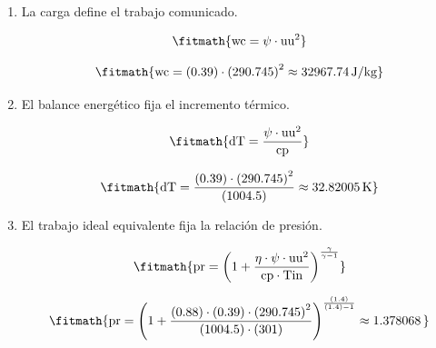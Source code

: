 \begin{enumerate}

\item La carga define el trabajo comunicado.

\[\fitmath{\mathrm{wc}=\psi\cdot {\mathrm{uu}}^{2}}\]

\[\fitmath{\mathrm{wc}=(0.39)\cdot {(290.745)}^{2}\approx 32967.74\,\mathrm{J/kg}}\]

\item El balance energético fija el incremento térmico.

\[\fitmath{\mathrm{dT}=\frac{\psi\cdot {\mathrm{uu}}^{2}}{\mathrm{cp}}}\]

\[\fitmath{\mathrm{dT}=\frac{(0.39)\cdot {(290.745)}^{2}}{(1004.5)}\approx 32.82005\,\mathrm{K}}\]

\item El trabajo ideal equivalente fija la relación de presión.

\[\fitmath{\mathrm{pr}={\left(1+\frac{\eta\cdot \psi\cdot {\mathrm{uu}}^{2}}{\mathrm{cp}\cdot \mathrm{Tin}}\right)}^{\frac{\gamma}{\gamma-1}}}\]

\[\fitmath{\mathrm{pr}={\left(1+\frac{(0.88)\cdot (0.39)\cdot {(290.745)}^{2}}{(1004.5)\cdot (301)}\right)}^{\frac{(1.4)}{(1.4)-1}}\approx 1.378068\,}\]

\end{enumerate}
